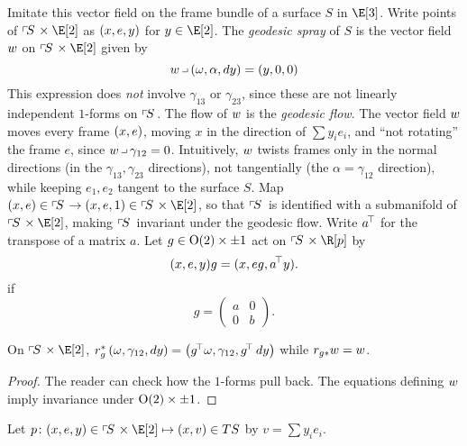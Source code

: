 Imitate this vector field on the frame bundle of a surface \(S\) in \(\E[3]\).
Write points of \(\frameBundle{S} \times \E[2]\) as \(\left(x,e,y\right)\) for \(y \in \E[2]\).
The \emph{geodesic spray} of \(S\) is  the vector field \(w\) on \(\frameBundle{S} \times \E[2]\) given by
\[
\geodesicVectorField \hook \pr{\omega,\alpha,dy}=\pr{y,0,0}
\]
This expression does \emph{not} involve \(\gamma_{13}\) or \(\gamma_{23}\), since these are not linearly independent \(1\)-forms on \(\left\ulcorner\!S\right.\).
The flow of \(w\) is the \emph{geodesic flow}.%
The vector field \(w\) moves every frame \(\left(x,e\right)\), moving \(x\) in the direction of \(\sum y_i e_i\), and ``not rotating'' the frame \(e\), since \(\geodesicVectorField \hook \gamma_{12}=0\).
Intuitively, \(w\) twists frames only in the normal directions (in the \(\gamma_{13}, \gamma_{23}\) directions), not tangentially (the \(\alpha=\gamma_{12}\) direction), while keeping \(e_1,e_2\) tangent to the surface \(S\).
Map \(\pr{x,e} \in \frameBundle{S} \to \pr{x,e,1} \in \frameBundle{S} \times \E[2]\), so that \(\left\ulcorner\!S\right.\) is identified with a submanifold of \(\frameBundle{S} \times \E[2]\), making \(\left\ulcorner\!S\right.\) invariant under the geodesic flow.
Write \(a^{\!\top}\) for the transpose of a matrix \(a\).
Let \(g \in \textrm{O}\!\left(2\right) \times \pm 1\) act on \(\frameBundle{S} \times \R[p]\) by
\[
(x,e,y)g=(x,eg,a^{\!\top} y).
\]
if
\[
g = \begin{pmatrix}
        a & 0 \\
        0 & b
       \end{pmatrix}.
\]

\begin{lemma}
On \(\frameBundle{S} \times \E[2]\), \(r^*_g \left(\omega,\gamma_{12},dy\right)=\left(g^{\!\top} \omega, \gamma_{12}, g^{\!\top} \, dy\right)\) while \(r_{g*} w=w\).
\end{lemma}
\begin{proof}
The reader can check how the \(1\)-forms pull back.
The equations defining \(w\) imply invariance under \(\textrm{O}\!\left(2\right) \times \pm 1\).
\end{proof}

Let \(p \colon (x,e,y) \in \frameBundle{S} \times \E[2] \mapsto (x,v) \in TS\) by \(v=\sum y_i e_i\).

